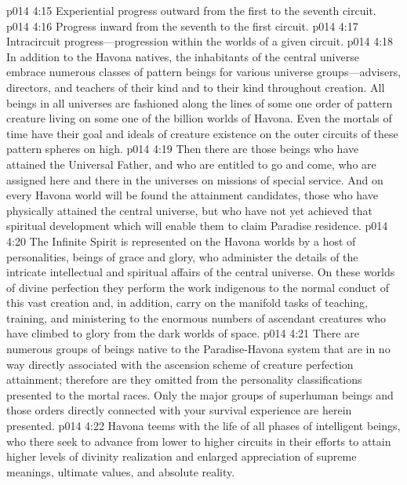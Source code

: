 \pc \vs p014 4:15 \bibnobreakspace Experiential progress outward from the first to the seventh circuit.
\vs p014 4:16 \bibnobreakspace Progress inward from the seventh to the first circuit.
\vs p014 4:17 \bibnobreakspace Intracircuit progress---progression within the worlds of a given circuit.
\pc \vs p014 4:18 In addition to the Havona natives, the inhabitants of the central universe embrace numerous classes of pattern beings for various universe groups---advisers, directors, and teachers of their kind and to their kind throughout creation. All beings in all universes are fashioned along the lines of some one order of pattern creature living on some one of the billion worlds of Havona. Even the mortals of time have their goal and ideals of creature existence on the outer circuits of these pattern spheres on high.
\vs p014 4:19 Then there are those beings who have attained the Universal Father, and who are entitled to go and come, who are assigned here and there in the universes on missions of special service. And on every Havona world will be found the attainment candidates, those who have physically attained the central universe, but who have not yet achieved that spiritual development which will enable them to claim Paradise residence.
\vs p014 4:20 The Infinite Spirit is represented on the Havona worlds by a host of personalities, beings of grace and glory, who administer the details of the intricate intellectual and spiritual affairs of the central universe. On these worlds of divine perfection they perform the work indigenous to the normal conduct of this vast creation and, in addition, carry on the manifold tasks of teaching, training, and ministering to the enormous numbers of ascendant creatures who have climbed to glory from the dark worlds of space.
\vs p014 4:21 There are numerous groups of beings native to the Paradise\hyp{}Havona system that are in no way directly associated with the ascension scheme of creature perfection attainment; therefore are they omitted from the personality classifications presented to the mortal races. Only the major groups of superhuman beings and those orders directly connected with your survival experience are herein presented.
\vs p014 4:22 Havona teems with the life of all phases of intelligent beings, who there seek to advance from lower to higher circuits in their efforts to attain higher levels of divinity realization and enlarged appreciation of supreme meanings, ultimate values, and absolute reality.
%
